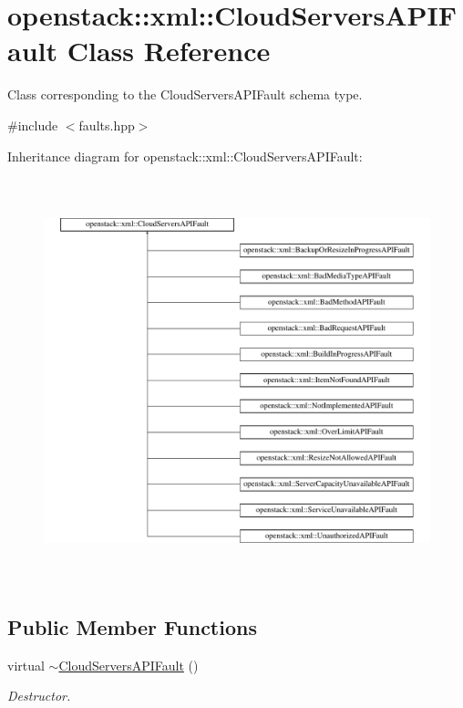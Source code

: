 \hypertarget{classopenstack_1_1xml_1_1CloudServersAPIFault}{
\section{openstack::xml::CloudServersAPIFault Class Reference}
\label{classopenstack_1_1xml_1_1CloudServersAPIFault}
}


Class corresponding to the CloudServersAPIFault schema type.  




{\ttfamily \#include $<$faults.hpp$>$}

Inheritance diagram for openstack::xml::CloudServersAPIFault:\begin{figure}[H]
\begin{center}
\leavevmode
\includegraphics[height=11.741935cm]{classopenstack_1_1xml_1_1CloudServersAPIFault}
\end{center}
\end{figure}
\subsection*{Public Member Functions}
\begin{DoxyCompactItemize}
\item 
\hypertarget{classopenstack_1_1xml_1_1CloudServersAPIFault_ad08e7313cff8ba3ab986761389d7b903}{
virtual \hyperlink{classopenstack_1_1xml_1_1CloudServersAPIFault_ad08e7313cff8ba3ab986761389d7b903}{$\sim$CloudServersAPIFault} ()}
\label{classopenstack_1_1xml_1_1CloudServersAPIFault_ad08e7313cff8ba3ab986761389d7b903}

\begin{DoxyCompactList}\small\item\em Destructor. \item\end{DoxyCompactList}\end{DoxyCompactItemize}
